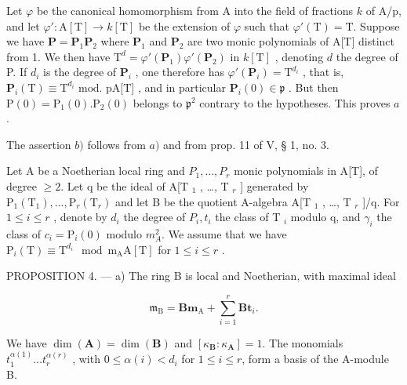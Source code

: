 Let \(\varphi\) be the canonical homomorphism from A into the field of fractions \(k\) of A/p, and let \(\varphi':\mathrm{A}[\mathrm{T}]\to k[\mathrm{T}]\) be the extension of \(\varphi\) such that \(\varphi'(\mathrm{T})=\mathrm{T}\). Suppose we have \(\mathbf{P}=\mathbf{P}_{1}\mathbf{P}_{2}\) where \(\mathbf{P}_{1}\) and \(\mathbf{P}_{2}\) are two monic polynomials of A{[}T{]} distinct from 1. We then have \(\mathrm{T}^{d}=\varphi'(\mathbf{P}_{1})\varphi'(\mathbf{P}_{2})\) in \(k[\mathrm{T}]\) , denoting \(d\) the degree of P. If \(d_{i}\) is the degree of \(\mathbf{P}_{i}\) , one therefore has \(\varphi'(\mathbf{P}_{i})=\mathrm{T}^{d_{i}}\) , that is, \(\mathbf{P}_{i}(\mathrm{T})\equiv\mathrm{T}^{d_{i}}\text{ mod. pA[T]}\) , and in particular \(\mathbf{P}_{i}(0)\in\mathfrak{p}\) . But then \(\mathrm{P}(0)=\mathrm{P}_{1}(0).\mathrm{P}_{2}(0)\) belongs to \(\mathfrak{p}^{2}\) contrary to the hypotheses. This proves \(a\).

The assertion \(b)\) follows from \(a)\) and from prop. 11 of V, § 1, no. 3.

Let A be a Noetherian local ring and \(P_{1}, \ldots, P_{r}\) monic polynomials in A{[}T{]}, of degree \(\geqslant 2\). Let q be the ideal of A{[}T \(_{1}\) , \ldots, T \(_{r}\) {]} generated by \(\mathrm{P}_{1}(\mathrm{T}_{1}), \ldots, \mathrm{P}_{r}(\mathrm{T}_{r})\) and let B be the quotient A-algebra A{[}T \(_{1}\) , \ldots, T \(_{r}\) {]}/q. For \(1 \leqslant i \leqslant r\) , denote by \(d_{i}\) the degree of \(P_{i}, t_{i}\) the class of T \(_{i}\) modulo q, and \(\gamma_{i}\) the class of \(c_{i} = \mathrm{P}_{i}(0)\) modulo \(m_{A}^{2}\). We assume that we have \(\mathrm{P}_{i}(\mathrm{T}) \equiv \mathrm{T}^{d_{i}} \mod \mathrm{m}_{\mathrm{A}}\mathrm{A}[\mathrm{T}]\) for \(1 \leqslant i \leqslant r\) .

PROPOSITION 4. --- a) The ring B is local and Noetherian, with maximal ideal

\[
\mathfrak {m} _ {\mathrm{B}} = \mathbf {B m} _ {\mathrm{A}} + \sum_ {i = 1} ^ {r} \mathbf {B t} _ {i}.
\]

We have \(\dim(\mathbf{A}) = \dim(\mathbf{B})\) and \([\kappa_{\mathbf{B}}: \kappa_{\mathbf{A}}] = 1\). The monomials \(t_1^{\alpha(1)} \ldots t_r^{\alpha(r)}\) , with \(0 \leqslant \alpha(i) < d_i\) for \(1 \leqslant i \leqslant r\), form a basis of the A-module B.

